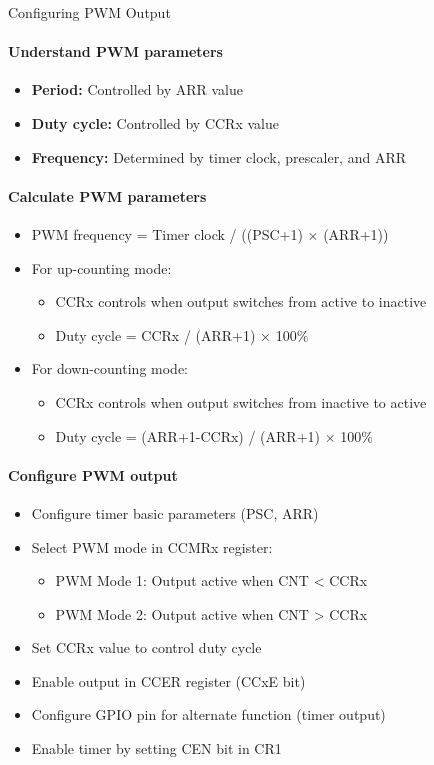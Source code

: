 \begin{KR}{Configuring PWM Output}\\
\paragraph{Understand PWM parameters}
\begin{itemize}
    \item \textbf{Period:} Controlled by ARR value
    \item \textbf{Duty cycle:} Controlled by CCRx value
    \item \textbf{Frequency:} Determined by timer clock, prescaler, and ARR
\end{itemize}

\paragraph{Calculate PWM parameters}
\begin{itemize}
    \item PWM frequency = Timer clock / ((PSC+1) × (ARR+1))
    \item For up-counting mode:
    \begin{itemize}
        \item CCRx controls when output switches from active to inactive
        \item Duty cycle = CCRx / (ARR+1) × 100\%
    \end{itemize}
    \item For down-counting mode:
    \begin{itemize}
        \item CCRx controls when output switches from inactive to active
        \item Duty cycle = (ARR+1-CCRx) / (ARR+1) × 100\%
    \end{itemize}
\end{itemize}

\paragraph{Configure PWM output}
\begin{itemize}
    \item Configure timer basic parameters (PSC, ARR)
    \item Select PWM mode in CCMRx register:
    \begin{itemize}
        \item PWM Mode 1: Output active when CNT < CCRx
        \item PWM Mode 2: Output active when CNT > CCRx
    \end{itemize}
    \item Set CCRx value to control duty cycle
    \item Enable output in CCER register (CCxE bit)
    \item Configure GPIO pin for alternate function (timer output)
    \item Enable timer by setting CEN bit in CR1
\end{itemize}
\end{KR}

